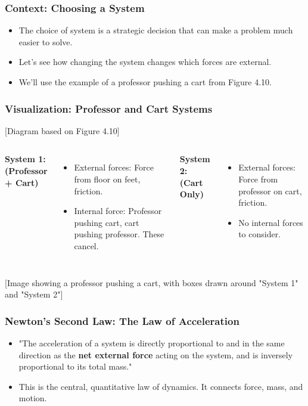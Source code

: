 \documentclass{beamer}
\begin{document}
\begin{frame}
\frametitle{Context: Choosing a System}
\begin{itemize}
    \item The choice of system is a strategic decision that can make a problem much easier to solve. \pause
    \item Let's see how changing the system changes which forces are external. \pause
    \item We'll use the example of a professor pushing a cart from Figure 4.10.
\end{itemize}
\end{frame}

\begin{frame}
\frametitle{Visualization: Professor and Cart Systems}
\begin{alertblock}{[Diagram based on Figure 4.10]}
\begin{columns}[T]
    \textbf{System 1: (Professor + Cart)}
    \begin{itemize}
        \item External forces: Force from floor on feet, friction.
        \item Internal force: Professor pushing cart, cart pushing professor. These cancel.
    \end{itemize}
    \textbf{System 2: (Cart Only)}
    \begin{itemize}
        \item External forces: Force from professor on cart, friction.
        \item No internal forces to consider.
    \end{itemize}
\end{columns}
\alert{[Image showing a professor pushing a cart, with boxes drawn around "System 1" and "System 2"]}
\end{alertblock}
\end{frame}

\begin{frame}
\frametitle{Newton's Second Law: The Law of Acceleration}
\begin{itemize}
    \item "The acceleration of a system is directly proportional to and in the same direction as the \textbf{net external force} acting on the system, and is inversely proportional to its total mass." \pause
    \item This is the central, quantitative law of dynamics. It connects force, mass, and motion.
\end{itemize}
\end{frame}
\end{document}
